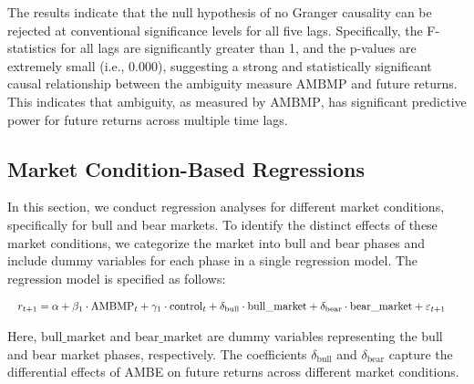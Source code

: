\documentclass[preprint,12pt,authoryear]{elsarticle}
\begin{document}
The results indicate that the null hypothesis of no Granger causality can be rejected at conventional significance levels for all five lags. Specifically, the F-statistics for all lags are significantly greater than 1, and the p-values are extremely small (i.e., 0.000), suggesting a strong and statistically significant causal relationship between the ambiguity measure \( \text{AMBMP} \) and future returns. This indicates that ambiguity, as measured by \( \text{AMBMP} \), has significant predictive power for future returns across multiple time lags.


\subsection{Market Condition-Based Regressions}

In this section, we conduct regression analyses for different market conditions, specifically for bull and bear markets. To identify the distinct effects of these market conditions, we categorize the market into bull and bear phases and include dummy variables for each phase in a single regression model. The regression model is specified as follows:

\begin{equation}
\resizebox{\textwidth}{!}{$
\begin{aligned}
r_{t+1} &= \alpha + \beta_1 \cdot \mathrm{AMBMP}_t + \gamma_1 \cdot \mathrm{control}_t + \delta_{\text{bull}} \cdot \text{bull\_market} + \delta_{\text{bear}} \cdot \text{bear\_market} + \varepsilon_{t+1}
\end{aligned}
$}
\end{equation}

Here, $\text{bull\_market}$ and $\text{bear\_market}$ are dummy variables representing the bull and bear market phases, respectively. The coefficients $\delta_{\text{bull}}$ and $\delta_{\text{bear}}$ capture the differential effects of AMBE on future returns across different market conditions.
\end{document}
